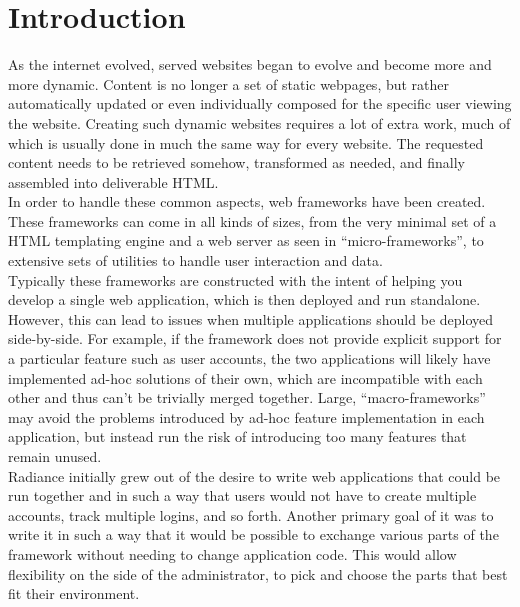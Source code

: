 \documentclass{sig-alternate}
\begin{document}
\newpage

\section{Introduction}
As the internet evolved, served websites began to evolve and become more and more dynamic. Content is no longer a set of static webpages, but rather automatically updated or even individually composed for the specific user viewing the website. Creating such dynamic websites requires a lot of extra work, much of which is usually done in much the same way for every website. The requested content needs to be retrieved somehow, transformed as needed, and finally assembled into deliverable HTML. \\

In order to handle these common aspects, web frameworks have been created. These frameworks can come in all kinds of sizes, from the very minimal set of a HTML templating engine and a web server as seen in ``micro-frameworks''\cite{microframeworks}, to extensive sets of utilities to handle user interaction and data. \\

Typically these frameworks are constructed with the intent of helping you develop a single web application, which is then deployed and run standalone. However, this can lead to issues when multiple applications should be deployed side-by-side. For example, if the framework does not provide explicit support for a particular feature such as user accounts, the two applications will likely have implemented ad-hoc solutions of their own, which are incompatible with each other and thus can't be trivially merged together. Large, ``macro-frameworks'' may avoid the problems introduced by ad-hoc feature implementation in each application, but instead run the risk of introducing too many features that remain unused. \\

Radiance initially grew out of the desire to write web applications that could be run together and in such a way that users would not have to create multiple accounts, track multiple logins, and so forth. Another primary goal of it was to write it in such a way that it would be possible to exchange various parts of the framework without needing to change application code. This would allow flexibility on the side of the administrator, to pick and choose the parts that best fit their environment.
\end{document}
